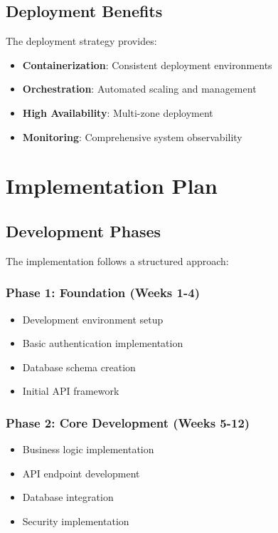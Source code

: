 \documentclass[11pt,a4paper,oneside]{article}
\begin{document}
\subsection{Deployment Benefits}

The deployment strategy provides:

\begin{itemize}
\item \textbf{Containerization}: Consistent deployment environments
\item \textbf{Orchestration}: Automated scaling and management
\item \textbf{High Availability}: Multi-zone deployment
\item \textbf{Monitoring}: Comprehensive system observability
\end{itemize}

\section{Implementation Plan}

\subsection{Development Phases}

The implementation follows a structured approach:

\subsubsection{Phase 1: Foundation (Weeks 1-4)}
\begin{itemize}
\item Development environment setup
\item Basic authentication implementation
\item Database schema creation
\item Initial API framework
\end{itemize}

\subsubsection{Phase 2: Core Development (Weeks 5-12)}
\begin{itemize}
\item Business logic implementation
\item API endpoint development
\item Database integration
\item Security implementation
\end{itemize}
\end{document}
